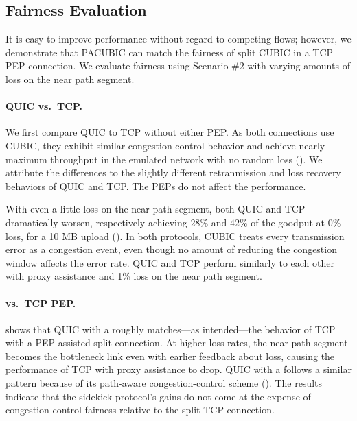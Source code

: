 \subsection{Fairness Evaluation}
\label{sec:eval:pep-comparison}



It is easy to improve performance without regard to competing flows;
however, we demonstrate that PACUBIC can
match the fairness of split CUBIC in a TCP PEP connection\@.
We evaluate fairness using Scenario \#2 with varying amounts of loss on the
near path segment.

\paragraph{QUIC vs.\ TCP\@.}
We first compare QUIC to TCP without either PEP\@.
As both connections use CUBIC, they exhibit similar
congestion control behavior and achieve nearly maximum throughput in the
emulated network with no random loss ().
We attribute the differences to the slightly different retranmission and
loss recovery behaviors of QUIC and TCP\@. The PEPs do not affect the
performance.

With even a little loss on the near path segment, both QUIC and TCP dramatically
worsen, respectively achieving $28\%$ and $42\%$ of the goodput at $0\%$ loss,
for a 10 MB upload ().
In both protocols, CUBIC treats every transmission error as a congestion event,
even though no amount of reducing the congestion window affects the error rate.
QUIC and TCP perform similarly to each other with proxy assistance and 1\%
loss on the near path segment.

\paragraph{\Sys vs.\ TCP PEP\@.}
 shows that QUIC with a \sys roughly matches---as intended---the behavior of
TCP with a PEP-assisted split connection. At higher loss rates, the near path segment becomes
the bottleneck link even with earlier feedback about loss, causing the
performance of TCP with proxy assistance to drop. QUIC with a \sys follows a similar
pattern because of its path-aware congestion-control scheme ().
The results indicate that the sidekick protocol's gains do not come at the
expense of congestion-control fairness relative to the split TCP connection.

